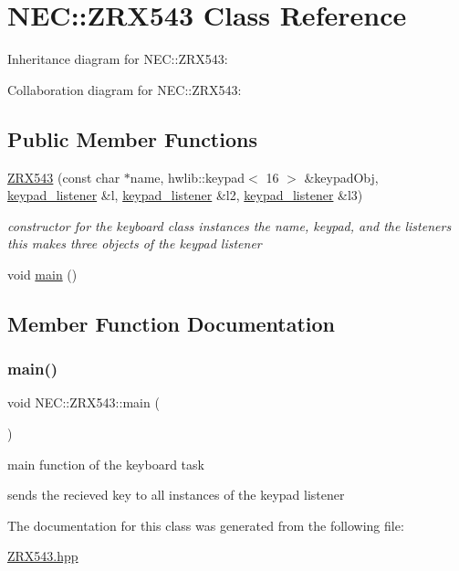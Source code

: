 \hypertarget{classNEC_1_1ZRX543}{}\section{N\+EC\+:\+:Z\+R\+X543 Class Reference}
\label{classNEC_1_1ZRX543}


Inheritance diagram for N\+EC\+:\+:Z\+R\+X543\+:


Collaboration diagram for N\+EC\+:\+:Z\+R\+X543\+:
\subsection*{Public Member Functions}
\begin{DoxyCompactItemize}
\item 
\mbox{\label{classNEC_1_1ZRX543_a4f3769d8eede7774272e0637eace4592}} 
\hyperlink{classNEC_1_1ZRX543_a4f3769d8eede7774272e0637eace4592}{Z\+R\+X543} (const char $\ast$name, hwlib\+::keypad$<$ 16 $>$ \&keypad\+Obj, \hyperlink{classNEC_1_1keypad__listener}{keypad\+\_\+listener} \&l, \hyperlink{classNEC_1_1keypad__listener}{keypad\+\_\+listener} \&l2, \hyperlink{classNEC_1_1keypad__listener}{keypad\+\_\+listener} \&l3)
\begin{DoxyCompactList}\small\item\em constructor for the keyboard class instances the name, keypad, and the listeners this makes three objects of the keypad listener \end{DoxyCompactList}\item 
void \hyperlink{classNEC_1_1ZRX543_a7d685a3e6cfe4c18869c44361d8806ef}{main} ()
\end{DoxyCompactItemize}


\subsection{Member Function Documentation}
\mbox{\label{classNEC_1_1ZRX543_a7d685a3e6cfe4c18869c44361d8806ef}} 
\subsubsection{\texorpdfstring{main()}{main()}}
{\footnotesize\ttfamily void N\+E\+C\+::\+Z\+R\+X543\+::main (\begin{DoxyParamCaption}{ }\end{DoxyParamCaption})\hspace{0.3cm}{\ttfamily [inline]}}

main function of the keyboard task

sends the recieved key to all instances of the keypad listener 

The documentation for this class was generated from the following file\+:\begin{DoxyCompactItemize}
\item 
\hyperlink{ZRX543_8hpp}{Z\+R\+X543.\+hpp}\end{DoxyCompactItemize}
